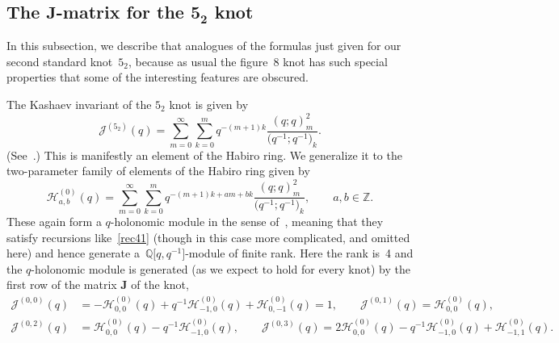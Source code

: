 \documentclass[pdftex]{sigma}
\numberwithin{equation}{section}
\def\BZ{\mathbb Z}
\def\Q{\mathbb Q}
\def\m{ - }
\def\i{^{-1}}
\def\calJ{\mathcal J} %
\def\be{\begin{equation}}
\def\ee{\end{equation}}
\def\bJ{J} \def\bJ{\mathbf{J}}
\def\sJ{\mathcal{J}}
\def\sH{\mathcal H} %
\begin{document}
\subsection[The J-matrix for the 5\_2 knot]{The $\bJ$-matrix for the $\boldsymbol{5_2}$ knot}
\label{sub.52statesum}

In this subsection, we describe that analogues of the formulas just given for our second
standard knot~$5_2$, because as usual the figure~8 knot has such special properties that
some of the interesting features are obscured. %

The Kashaev invariant of the $5_2$ knot is given by
\be
\label{Kashaev.52}
 \calJ^{(5_2)}(q) =\sum_{m=0}^{\infty} \sum_{k=0}^m
q^{-(m+1)k} \frac{(q;q)_m^2}{\big(q^{-1};q^{-1}\big)_k} .
\ee
(See~\cite[equation~2.3]{K97}.) This is manifestly an element of the Habiro ring. We
generalize it to the two-parameter family of elements of the Habiro ring given by
\be
\label{52desc}
\sH^{(0)}_{a,b}(q) =\sum_{m=0}^{\infty} \sum_{k=0}^m
q^{-(m+1)k + am+bk} \frac{(q;q)_m^2}{\big(q^{-1};q^{-1}\big)_k}, \qquad a,b \in \BZ .
\ee
These again form a $q$-holonomic module in the sense of~\cite{WZ}, meaning
that they satisfy recursions like~\eqref{rec41} (though in this case more complicated,
and omitted here) and hence generate a~$\Q\big[q,q\i\big]$-module of finite rank. Here the rank
is~4 and the $q$-holonomic module is generated (as we expect to hold for every knot)
by the first row of the matrix $\bJ$ of the knot,
\begin{align*}%
 \sJ^{(0,0)}(q) &
 =- \sH^{(0)}_{0,0}(q)+q^{-1} \sH^{(0)}_{-1,0}(q)+\sH^{(0)}_{0,-1}(q)=1 , \qquad
\sJ^{(0,1)}(q) =\sH^{(0)}_{0,0}(q) , \\
\sJ^{(0,2)}(q) & =\sH^{(0)}_{0,0}(q) \m q^{-1}\sH^{(0)}_{-1,0}(q) , \qquad
\sJ^{(0,3)}(q) = 2\sH^{(0)}_{0,0}(q) \m q^{-1} \sH^{(0)}_{-1,0}(q)
+ \sH^{(0)}_{-1,1}(q) .
\end{align*}
\end{document}

